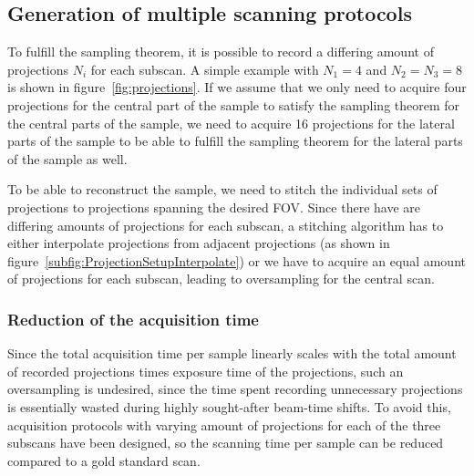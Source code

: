 \subsection{Generation of multiple scanning protocols}
\cbstart
To fulfill the sampling theorem, it is possible to record a differing amount of projections $N_{i}$ for each subscan. A simple example with $N_{1}=4$ and $N_{2}=N_{3}=8$ is shown in figure~\ref{fig:projections}. If we assume that we only need to acquire four projections for the central part of the sample to satisfy the sampling theorem for the central parts of the sample, we need to acquire 16 projections for the lateral parts of the sample to be able to fulfill the sampling theorem for the lateral parts of the sample as well.

To be able to reconstruct the sample, we need to stitch the individual sets of projections to projections spanning the desired FOV. Since there have are differing amounts of projections for each subscan, a stitching algorithm has to either interpolate projections from adjacent projections (as shown in figure~\ref{subfig:ProjectionSetupInterpolate}) or we have to acquire an equal amount of projections for each subscan, leading to oversampling for the central scan.

\begin{figure*}[htp]
	\centering
	\subfloat[]{%
		\label{subfig:ProjectionSetup}%
		}%
	\subfloat[]{%
		\label{subfig:ProjectionSetupInterpolate}%
		}%
	\caption[Setup with one central and two lateral scans]{Setup with one central (green) and two lateral scans (red and blue, respectively). For demonstration purposes, the central scan has four projections and the lateral scans have eight projections each (all acquired over \SI{180}{\degree}). The colors of the three positions correspond to the colors shown in figure~\ref{subfig:scanning-possibilities}. : scanned projections, : scanned projections and additional interpolated projections (dashed) needed to correctly merge all projections.}
	\label{fig:projections}
\end{figure*}
\cbend

\subsubsection{Reduction of the acquisition time}
\cbstart
Since the total acquisition time per sample linearly scales with the total amount of recorded projections times exposure time of the projections, such an oversampling is undesired, since the time spent recording unnecessary projections is essentially wasted during highly sought-after beam-time shifts. To avoid this, acquisition protocols with varying amount of projections for each of the three subscans have been designed, so the scanning time per sample can be reduced compared to a gold standard scan.


